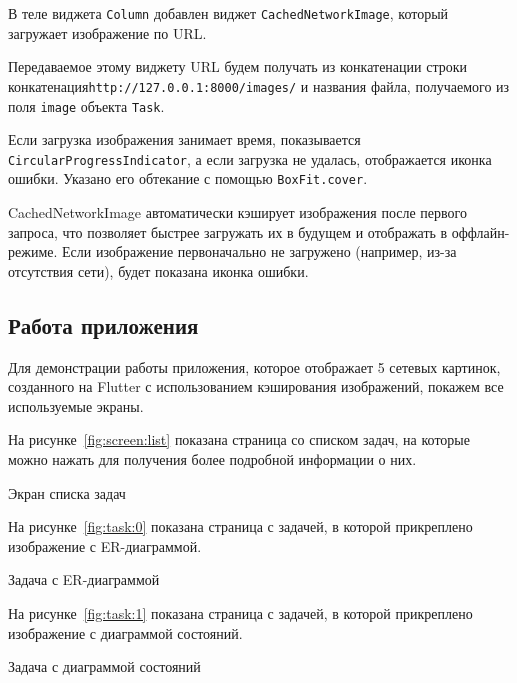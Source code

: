 В теле виджета \texttt{Column} добавлен виджет \texttt{CachedNetworkImage},
который загружает изображение по URL.\par
Передаваемое этому виджету URL будем получать из конкатенации
строки конкатенация\texttt{http://127.0.0.1:8000/images/} и
названия файла, получаемого из поля \texttt{image} объекта \texttt{Task}.\par
Если загрузка изображения занимает время,
показывается \texttt{CircularProgressIndicator},
а если загрузка не удалась, отображается иконка ошибки.
Указано его обтекание с помощью \texttt{BoxFit.cover}.\par
CachedNetworkImage автоматически кэширует изображения после первого запроса,
что позволяет быстрее загружать их в будущем и отображать в оффлайн-режиме.
Если изображение первоначально не загружено (например, из-за отсутствия сети),
будет показана иконка ошибки.

\subsection{Работа приложения}

Для демонстрации работы приложения,
которое отображает 5 сетевых картинок,
созданного на Flutter с использованием кэширования изображений,
покажем все используемые экраны.

На рисунке~\ref{fig:screen:list} показана страница со списком задач,
на которые можно нажать для получения более подробной информации о них.

\begin{image}
	\caption{Экран списка задач}
	\label{fig:screen:list}
\end{image}

На рисунке~\ref{fig:task:0} показана страница с задачей,
в которой прикреплено изображение с ER-диаграммой.

\begin{image}
	\caption{Задача с ER-диаграммой}
	\label{fig:task:0}
\end{image}

На рисунке~\ref{fig:task:1} показана страница с задачей,
в которой прикреплено изображение с диаграммой состояний.

\begin{image}
	\caption{Задача с диаграммой состояний}
	\label{fig:task:1}
\end{image}

